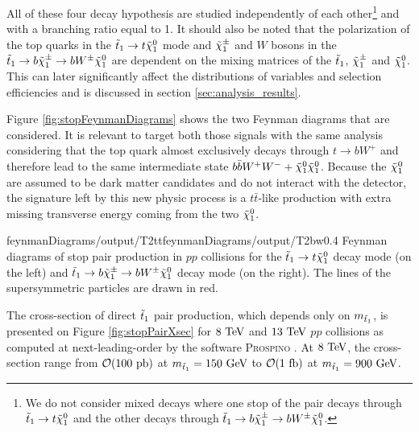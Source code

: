         All of these four decay hypothesis are studied independently
        of each other\footnote{We do not consider mixed decays where one stop of the pair
        decays through $\tilde{t}_1 \rightarrow t \tilde{\chi}_1^0$ and the other decays through
        $\tilde{t}_1 \rightarrow b \tilde{\chi}_1^\pm \rightarrow b W^{\pm} \tilde{\chi}_1^0$.} and with a
        branching ratio equal to 1. It should also be noted that the polarization of the
        top quarks in the $\tilde{t}_1 \rightarrow t \tilde{\chi}_1^0$ mode and $\tilde{\chi}_1^\pm$ and
        $W$ bosons in the $\tilde{t}_1 \rightarrow b \tilde{\chi}_1^\pm \rightarrow b W^{\pm}
        \tilde{\chi}_1^0$ are dependent on the mixing matrices of the $\tilde{t}_1$, $\tilde{\chi}_1^\pm$
        and $\tilde{\chi}_1^0$. This can later significantly affect the distributions of
        variables and selection efficiencies and is discussed in section
        \ref{sec:analysis_results}.

        Figure \ref{fig:stopFeynmanDiagrams} shows the two Feynman diagrams that are
        considered. It is relevant to target both those signals with the same analysis
        considering that the top quark almost exclusively decays through $t \rightarrow
        b W^+$ and therefore lead to the same intermediate state $b \bar{b} W^+ W^- +
        \tilde{\chi}_1^0 \tilde{\chi}_1^0$. Because the $\tilde{\chi}_1^0$ are assumed to be dark
        matter candidates and do not interact with the detector, the signature left by
        this new physic process is a $t\bar{t}$-like production with extra missing
        transverse energy coming from the two $\tilde{\chi}_1^0$.

                         {feynmanDiagrams/output/T2tt}{feynmanDiagrams/output/T2bw}{0.4}
                         {Feynman diagrams of stop pair production in $pp$ collisions for the
                         $\tilde{t}_1 \rightarrow t \tilde{\chi}_1^0$ decay mode (on the left) and
                         $\tilde{t}_1 \rightarrow b \tilde{\chi}_1^\pm \rightarrow b W^{\pm} \tilde{\chi}_1^0$ decay mode
                         (on the right). The lines of the supersymmetric particles are drawn in red.}

        The cross-section of direct $\tilde{t}_1$ pair production, which depends only on $m_{\tilde{t}_1}$, is presented
        on Figure \ref{fig:stopPairXsec} for $8~\text{TeV}$ and $13~\text{TeV}$ $pp$ collisions as computed at next-leading-order
        by the software \textsc{Prospino} . At $8~\text{TeV}$, the cross-section range from $\mathcal{O}(100~\text{pb})$
        at $m_{\tilde{t}_1} = 150~\text{GeV}$ to $\mathcal{O}(1~\text{fb})$ at $m_{\tilde{t}_1} = 900 ~\text{GeV}$.

